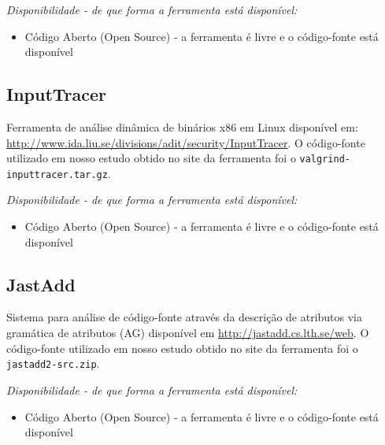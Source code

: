 \begin{description}

  \item {\it Disponibilidade - de que forma a ferramenta está disponível:}
    \begin{itemize}
      \item Código Aberto (Open Source) - a ferramenta é livre e o código-fonte está disponível
    \end{itemize}

\end{description}

\subsection{InputTracer}

Ferramenta de análise dinâmica de binários x86 em Linux
disponível em:
\url{http://www.ida.liu.se/divisions/adit/security/InputTracer}. O
código-fonte utilizado em nosso estudo obtido no site da ferramenta foi o
\texttt{valgrind-inputtracer.tar.gz}.

\begin{description}

  \item {\it Disponibilidade - de que forma a ferramenta está disponível:}
    \begin{itemize}
      \item Código Aberto (Open Source) - a ferramenta é livre e o código-fonte está disponível
    \end{itemize}

\end{description}

\subsection{JastAdd}

Sistema para análise de código-fonte através da descrição de
atributos via gramática de atributos (AG) disponível em \url{http://jastadd.cs.lth.se/web}. O código-fonte
utilizado em nosso estudo obtido no site da ferramenta foi o
\texttt{jastadd2-src.zip}.

\begin{description}

  \item {\it Disponibilidade - de que forma a ferramenta está disponível:}
    \begin{itemize}
      \item Código Aberto (Open Source) - a ferramenta é livre e o código-fonte está disponível
    \end{itemize}

\end{description}

